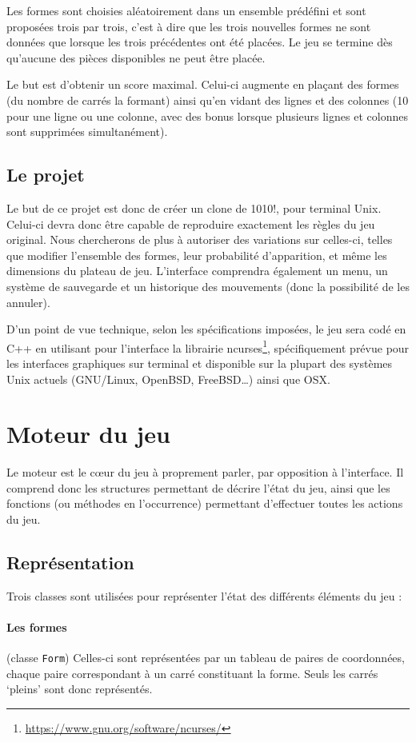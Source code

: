 \documentclass[11pt,a4paper]{article}
\begin{document}
Les formes sont choisies aléatoirement dans un ensemble prédéfini et sont proposées trois par trois, c'est à dire que les trois nouvelles formes ne sont données que lorsque les trois précédentes ont été placées. Le jeu se termine dès qu'aucune des pièces disponibles ne peut être placée.

Le but est d'obtenir un score maximal. Celui-ci augmente en plaçant des formes (du nombre de carrés la formant) ainsi qu'en vidant des lignes et des colonnes (10 pour une ligne ou une colonne, avec des bonus lorsque plusieurs lignes et colonnes sont supprimées simultanément).

\subsection*{Le projet}
Le but de ce projet est donc de créer un clone de 1010!, pour terminal Unix. Celui-ci devra donc être capable de reproduire exactement les règles du jeu original. Nous chercherons de plus à autoriser des variations sur celles-ci, telles que modifier l'ensemble des formes, leur probabilité d'apparition, et même les dimensions du plateau de jeu. L'interface comprendra également un menu, un système de sauvegarde et un historique des mouvements (donc la possibilité de les annuler).

D'un point de vue technique, selon les spécifications imposées, le jeu sera codé en C++ en utilisant pour l'interface la librairie ncurses\footnote{\url{https://www.gnu.org/software/ncurses/}}, spécifiquement prévue pour les interfaces graphiques sur terminal et disponible sur la plupart des systèmes Unix actuels (GNU/Linux, OpenBSD, FreeBSD\dots) ainsi que OSX.


\clearpage
\section{Moteur du jeu}
Le moteur est le cœur du jeu à proprement parler, par opposition à l'interface. Il comprend donc les structures permettant de décrire l'état du jeu, ainsi que les fonctions (ou méthodes en l'occurrence) permettant d'effectuer toutes les actions du jeu.

\subsection{Représentation}
Trois classes sont utilisées pour représenter l'état des différents éléments du jeu :

\paragraph{Les formes} (classe \verb"Form")
Celles-ci sont représentées par un tableau de paires de coordonnées, chaque paire correspondant à un carré constituant la forme. Seuls les carrés `pleins' sont donc représentés. 
\end{document}
